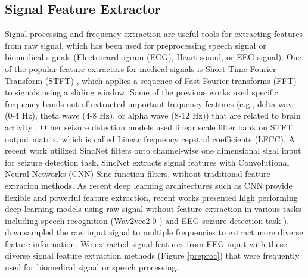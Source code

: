 \documentclass[pmlr,twocolumn,10pt]{jmlr}
\begin{document}
\subsection{Signal Feature Extractor}
Signal processing and frequency extraction are useful tools for extracting features from raw signal, which has been used for preprocessing speech signal or biomedical signals (Electrocardiogram (ECG), Heart sound, or EEG signal). One of the popular feature extractors for medical signals is Short Time Fourier Transform (STFT) \citep{sejdic2009time, springer2015logistic, sriraam2019convolutional}, which applies a sequence of Fast Fourier transforms (FFT) to signals using a sliding window. Some of the previous works used specific frequency bands out of extracted important frequency features (e.g., delta wave (0-4 Hz), theta wave (4-8 Hz), or alpha wave (8-12 Hz)) that are related to brain activity \citep{parvez2014eeg, liu2019epileptic}. Other seizure detection models \citep{shawki2020deep, thyagachandran2020seizure, golmohammadi2019automatic} used linear scale filter bank on STFT output matrix, which is called Linear frequency cepstral coefficients (LFCC). A recent work \citep{priyasad2021interpretable} utilized SincNet \citep{ravanelli2018speaker} filters onto channel-wise one dimensional sigal input for seizure detection task. SincNet extracts signal features with Convolutional Neural Networks (CNN) Sinc function filters, without traditional feature extracion methods. As recent deep learning architectures such as CNN provide flexible and powerful feature extraction, recent works presented high performing deep learning models using raw signal without feature extraction in various tasks including speech recognition (Wav2vec2.0 \citep{baevski2020wav2vec}) and EEG seizure detection task \citep{roy2019chrononet, mohsenvand2020contrastive}). \cite{mohsenvand2020contrastive} downsampled the raw input signal to multiple frequencies to extract more diverse feature information. We extracted signal features from EEG input with these diverse signal feature extraction methods (Figure \ref{preproc}) that were frequently used for biomedical signal or speech processing. 
\end{document}
